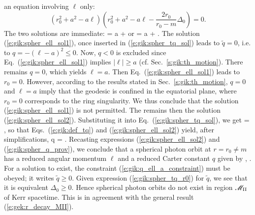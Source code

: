 an equation involving $\ell$ only:
\[
    (r_0^2 + a^2 - a \ell) \left( r_0^2 + a^2 - a \ell - \frac{2 r_0}{r_0 - m} \Delta_0 \right) = 0 .
\]
The two solutions are immediate:
\be \label{e:gik:spher_ell_sol1}
    \ell = a + 
\ee
or
\be \label{e:gik:spher_ell_sol2}
    \ell = a +   .
\ee
The solution (\ref{e:gik:spher_ell_sol1}), once inserted in (\ref{e:gik:spher_tq_sol})
leads to $\tilde{q} = 0$, i.e. to $q = - (\ell - a)^2 \leq 0$.
Now, $q<0$ is excluded since Eq.~(\ref{e:gik:spher_ell_sol1}) implies $|\ell| \geq a$
(cf. Sec.~\ref{s:gik:th_motion}). There remains $q=0$, which yields $\ell = a$. Then
Eq.~(\ref{e:gik:spher_ell_sol1}) leads to $r_0 = 0$. However, according to the
results stated in Sec.~\ref{s:gik:th_motion}, $q=0$ and $\ell = a$
imply that the geodesic is confined in the equatorial plane, where $r_0=0$
corresponds to the ring singularity. We thus conclude that the solution
(\ref{e:gik:spher_ell_sol1}) is not permitted. The remains then the solution
(\ref{e:gik:spher_ell_sol2}). Substituting it into Eq.~(\ref{e:gik:spher_tq_sol}), we get
\be \label{e:gik:spher_tq_r0}
     =  ,
\ee
so that Eqs.~(\ref{e:gik:def_tq}) and (\ref{e:gik:spher_ell_sol2}) yield, after simplifications,
\be \label{e:gik:spher_q_prov}
    q = \left[ - r_0^3 + 6 m r_0^2 - 9 m^2 r_0 + 4 a^2 m \right] .
\ee
Recasting expressions (\ref{e:gik:spher_ell_sol2}) and (\ref{e:gik:spher_q_prov}), we
conclude that a spherical photon orbit at $r=r_0\neq m$ has a reduced angular momentum $\ell$
and a reduced Carter constant $q$ given by
\be \label{e:gik:spher_ell_r0}
   ,
\ee
\be \label{e:gik:spher_q_r0}
     .
\ee
For a solution to exist, the constraint (\ref{e:gik:q_ell_a_constraint}) must
be obeyed; it writes $\tilde{q} \geq 0$. Given expression (\ref{e:gik:spher_tq_r0}) for
$\tilde{q}$, we see that it is equivalent $\Delta_0 \geq 0$. Hence spherical photon orbits
do not exist in region $\mathscr{M}_{\rm II}$ of Kerr spacetime. This is in agreement with the
general result (\ref{e:gek:r_decay_MII}).

